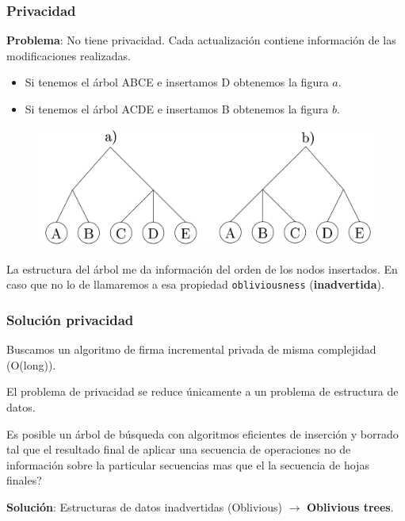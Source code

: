 \documentclass[10pt,handout]{beamer}
\begin{document}


\begin{frame}
\frametitle{Privacidad}
\textbf{Problema}: No tiene privacidad. Cada actualización contiene información de las
modificaciones realizadas.
\vspace{-0.2cm}
\begin{itemize}\itemsep-1em
  \item Si tenemos el árbol ABCE e insertamos D obtenemos la figura $a$.
  \item Si tenemos el árbol ACDE e insertamos B obtenemos la figura $b$.
\end{itemize}

\begin{figure}[h!]
    \centering
    \includegraphics[scale=0.25]{2-3tree.jpg}
\end{figure}

\pause
La estructura del árbol me da información del orden de los nodos insertados.
En caso que no lo de llamaremos a esa propiedad \texttt{obliviousness} (\textbf{inadvertida}).

\end{frame}

\begin{frame}
\frametitle{Solución privacidad}

Buscamos un algoritmo de firma incremental privada de misma complejidad (O(long)).

El problema de privacidad se reduce únicamente a un problema de estructura de datos.

\pause
Es posible un árbol de búsqueda con algoritmos eficientes de inserción y borrado tal que el
resultado final de aplicar una secuencia de operaciones no de información sobre la particular
secuencias mas que el la secuencia de hojas finales?

\pause
\textbf{Solución}: Estructuras de datos inadvertidas (Oblivious) $\to$ \textbf{Oblivious trees}.

\end{frame}
\end{document}
